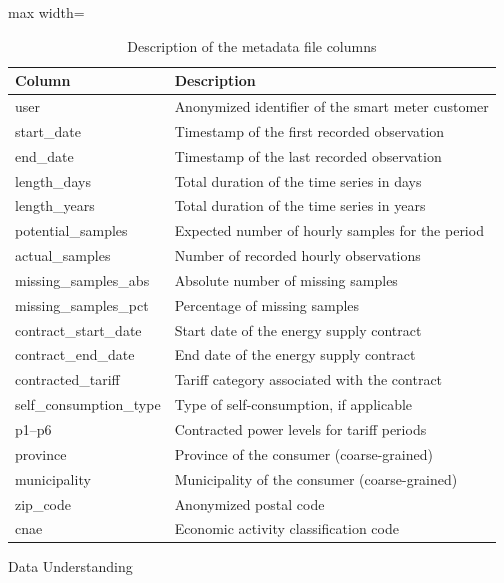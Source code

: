 ﻿\documentclass[12pt,reqno, twoside]{amsbook}
\makeatletter
\numberwithin{figure}{chapter}
\numberwithin{table}{chapter}
\numberwithin{equation}{chapter}
\def\section{\@startsection{section}{1}%
      \z@{.5\linespacing\@plus.7\linespacing}{.25\linespacing}%
      {\normalfont\bfseries\flushleft}}
\theoremstyle{plain}
\numberwithin{equation}{chapter}
\numberwithin{section}{chapter}
\makeatother
\begin{document}
\begin{table}[h]
\centering
\caption{Description of the metadata file columns}
\label{tab:metadata_description}
\begin{adjustbox}{max width=\textwidth}
\begin{tabular}{ll}
\hline
\textbf{Column} & \textbf{Description} \\
\hline
user & Anonymized identifier of the smart meter customer \\
start\_date & Timestamp of the first recorded observation \\
end\_date & Timestamp of the last recorded observation \\
length\_days & Total duration of the time series in days \\
length\_years & Total duration of the time series in years \\
potential\_samples & Expected number of hourly samples for the period \\
actual\_samples & Number of recorded hourly observations \\
missing\_samples\_abs & Absolute number of missing samples \\
missing\_samples\_pct & Percentage of missing samples \\
contract\_start\_date & Start date of the energy supply contract \\
contract\_end\_date & End date of the energy supply contract \\
contracted\_tariff & Tariff category associated with the contract \\
self\_consumption\_type & Type of self-consumption, if applicable \\
p1--p6 & Contracted power levels for tariff periods \\
province & Province of the consumer (coarse-grained) \\
municipality & Municipality of the consumer (coarse-grained) \\
zip\_code & Anonymized postal code \\
cnae & Economic activity classification code \\
\hline
\end{tabular}
\end{adjustbox}
\end{table}
\FloatBarrier

\section{Data Understanding}
\label{sec:data_understanding}
\end{document}
